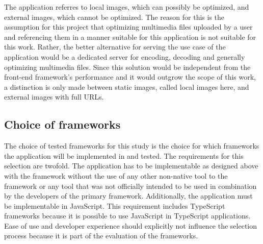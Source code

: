 \documentclass[a4paper, 10pt]{article}
\begin{document}
The application referres to local images, which can possibly be optimized, and external images, which cannot be optimized.
The reason for this is the assumption for this project that optimizing multimedia files uploaded by a user and referencing them in a manner suitable for this application is not suitable for this work.
Rather, the better alternative for serving the use case of the application would be a dedicated server for encoding, decoding and generally optimizing multimedia files.
Since this solution would be independent from the front-end framework's performance and it would outgrow the scope of this work, a distinction is only made between static images, called local images here, and external images with full URLs.

\subsection{Choice of frameworks}

The choice of tested frameworks for this study is the choice for which frameworks the application will be implemented in and tested.
The requirements for this selection are twofold.
The application has to be implementable as designed above with the framework without the use of any other non-native tool to the framework or any tool that was not officially intended to be used in combination by the developers of the primary framework.
Additionally, the application must be implementable in JavaScript.
This requirement includes TypeScript frameworks because it is possible to use JavaScript in TypeScript applications. %
Ease of use and developer experience should explicitly not influence the selection process because it is part of the evaluation of the frameworks.
\end{document}

